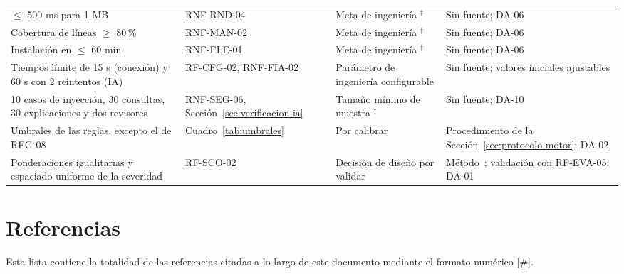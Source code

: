 \documentclass[11pt,a4paper]{report}
\newcommand{\dagsym}{\ensuremath{^{\dagger}}}
\begin{document}
\begin{footnotesize}
\begin{xltabular}{\linewidth}{@{}p{3.6cm}p{2.5cm}p{2.7cm}X@{}}
$\leq$ 500 ms para 1 MB & RNF-RND-04 & Meta de ingenier\'ia \dagsym{} & Sin fuente; DA-06 \\
Cobertura de l\'ineas $\geq$ 80\,\% & RNF-MAN-02 & Meta de ingenier\'ia \dagsym{} & Sin fuente; DA-06 \\
Instalaci\'on en $\leq$ 60 min & RNF-FLE-01 & Meta de ingenier\'ia \dagsym{} & Sin fuente; DA-06 \\
Tiempos l\'imite de 15 s (conexi\'on) y 60 s con 2 reintentos (IA) & RF-CFG-02, RNF-FIA-02 & Par\'ametro de ingenier\'ia configurable & Sin fuente; valores iniciales ajustables \\
10 casos de inyecci\'on, 30 consultas, 30 explicaciones y dos revisores & RNF-SEG-06, Secci\'on~\ref{sec:verificacion-ia} & Tama\~no m\'inimo de muestra \dagsym{} & Sin fuente; DA-10 \\
Umbrales de las reglas, excepto el de REG-08 & Cuadro~\ref{tab:umbrales} & Por calibrar & Procedimiento de la Secci\'on~\ref{sec:protocolo-motor}; DA-02 \\
Ponderaciones igualitarias y espaciado uniforme de la severidad & RF-SCO-02 & Decisi\'on de dise\~no por validar & M\'etodo~\cite{R32}; validaci\'on con RF-EVA-05; DA-01 \\
\end{xltabular}
\end{footnotesize}

\chapter{Referencias}
\label{ap:referencias}

Esta lista contiene la totalidad de las referencias citadas a lo largo de este documento mediante el formato numérico [\#].
\end{document}
